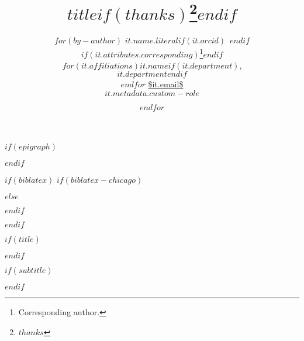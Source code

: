 
$if(epigraph)$
\usepackage{epigraph}
\renewcommand{\epigraphsize}{\sffamily\footnotesize}
\setlength{\epigraphrule}{0em}
\setlength{\beforeepigraphskip}{-2em}
\setlength{\afterepigraphskip}{1em}
$endif$

$if(biblatex)$
$if(biblatex-chicago)$
\usepackage[$if(biblio-style)$$biblio-style$,$endif$$for(biblatexoptions)$$biblatexoptions$$sep$,$endfor$]{biblatex-chicago}
$else$
\usepackage[$if(biblio-style)$style=$biblio-style$,$endif$$for(biblatexoptions)$$biblatexoptions$$sep$,$endfor$]{biblatex}
$endif$

\setlength\bibitemsep{0pt}  %
\renewcommand*{\bibfont}{\footnotesize}  %
\setlength\bibhang{\parindent}  %



$endif$

\usepackage{orcidlink}  %

$if(title)$
\title{$title$$if(thanks)$\thanks{$thanks$}$endif$}
$endif$

$if(subtitle)$
\usepackage{etoolbox}
\makeatletter
\providecommand{\subtitle}[1]{%
  \apptocmd{\@title}{\par {\vskip 0.25em \large #1 \par}}{}{}
}
\makeatother
\subtitle{$subtitle$}
$endif$

\author{
    $for(by-author)$
    {\large $it.name.literal$$if(it.orcid)$~$endif$}%
    $if(it.attributes.corresponding)$\thanks{Corresponding author.}$endif$ \\
    $for(it.affiliations)$$it.name$$if(it.department)$,\\ $it.department$$endif$ \\$endfor$
    {\footnotesize \url{$it.email$}} \\
    {\textbf{$it.metadata.custom-role$}} \and
    $endfor$
}


\date{}


%
\usepackage{url}

\newpage

